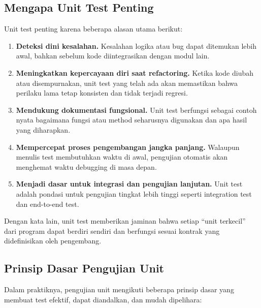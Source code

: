 \subsection{Mengapa Unit Test Penting}

Unit test penting karena beberapa alasan utama berikut:

\begin{enumerate}
    \item \textbf{Deteksi dini kesalahan.}  
    Kesalahan logika atau bug dapat ditemukan lebih awal, bahkan sebelum kode diintegrasikan dengan modul lain.
    
    \item \textbf{Meningkatkan kepercayaan diri saat refactoring.}  
    Ketika kode diubah atau disempurnakan, unit test yang telah ada akan memastikan bahwa perilaku lama tetap konsisten dan tidak terjadi regresi.
    
    \item \textbf{Mendukung dokumentasi fungsional.}  
    Unit test berfungsi sebagai contoh nyata bagaimana fungsi atau method seharusnya digunakan dan apa hasil yang diharapkan.
    
    \item \textbf{Mempercepat proses pengembangan jangka panjang.}  
    Walaupun menulis test membutuhkan waktu di awal, pengujian otomatis akan menghemat waktu debugging di masa depan.
    
    \item \textbf{Menjadi dasar untuk integrasi dan pengujian lanjutan.}  
    Unit test adalah pondasi untuk pengujian tingkat lebih tinggi seperti integration test dan end-to-end test.
\end{enumerate}

Dengan kata lain, unit test memberikan jaminan bahwa setiap “unit terkecil” dari program dapat berdiri sendiri dan berfungsi sesuai kontrak yang didefinisikan oleh pengembang.

\subsection{Prinsip Dasar Pengujian Unit}

Dalam praktiknya, pengujian unit mengikuti beberapa prinsip dasar yang membuat test efektif, dapat diandalkan, dan mudah dipelihara:

